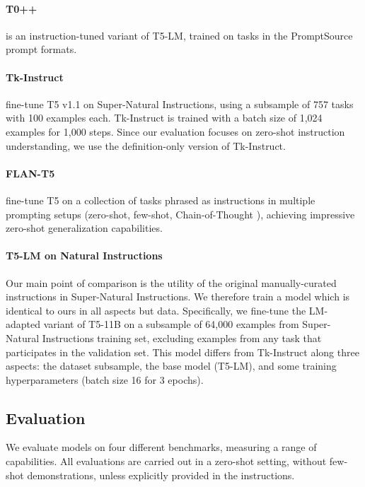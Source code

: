 \paragraph{T0++}
\citep{sanh2021multitask} is an instruction-tuned variant of T5-LM, trained on tasks in the PromptSource \citep{bach-etal-2022-promptsource} prompt formats.

\paragraph{Tk-Instruct}
\citet{supernaturalinstructions} fine-tune T5 v1.1 on Super-Natural Instructions, using a subsample of 757 tasks with 100 examples each. Tk-Instruct is trained with a batch size of 1,024 examples for 1,000 steps. Since our evaluation focuses on zero-shot instruction understanding, we use the definition-only version of Tk-Instruct.

\paragraph{FLAN-T5}
\citet{flampalm} fine-tune T5 on a collection of tasks phrased as instructions in multiple prompting setups (zero-shot, few-shot, Chain-of-Thought \citep{wei2022chain}), achieving impressive zero-shot generalization capabilities.

\paragraph{T5-LM on Natural Instructions} Our main point of comparison is the utility of the original manually-curated instructions in Super-Natural Instructions. We therefore train a model which is identical to ours in all aspects but data. Specifically, we fine-tune the LM-adapted variant of T5-11B on a subsample of 64,000 examples from Super-Natural Instructions training set, excluding examples from any task that participates in the validation set. This model differs from Tk-Instruct along three aspects: the dataset subsample, the base model (T5-LM), and some training hyperparameters (batch size 16 for 3 epochs).

\subsection{Evaluation}

We evaluate models on four different benchmarks, measuring a range of capabilities. All evaluations are carried out in a zero-shot setting, without few-shot demonstrations, unless explicitly provided in the instructions.

